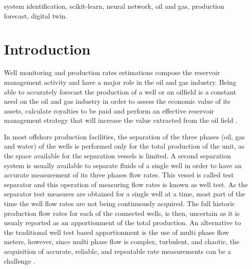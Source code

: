 \documentclass[conference]{IEEEtran}
\begin{document}
\begin{abstract}
\end{abstract}

\begin{IEEEkeywords}
system identification, scikit-learn, neural network, oil and gas, production forecast, digital twin.
\end{IEEEkeywords}

\section{Introduction}\label{section_introduction}

Well monitoring and production rates estimations compose the reservoir management activity 
and have a major role in the oil and gas industry. Being able to accurately forecast the 
production of a well or an oilfield is a constant need on the oil and gas industry in order 
to assess the economic value of its assets, calculate royalties to be paid and perform an 
effective reservoir management strategy that will increase the value extracted from the oil 
field \cite{alakeely2022simulating}.

In most offshore production facilities, the separation of the three phases (oil, gas and water)
of the wells is performed only for the total production of the unit, as the space available 
for the separation vessels is limited. A second separation system is usually available to 
separate fluids of a single well in order to have an accurate measurement of its three phases 
flow rates. This vessel is called test separator and this operation of measuring flow rates is 
known as well test. As the separator test measures are obtained for a single well at a time, 
most part of the time the well flow rates are not being continuously acquired. The full 
historic production flow rates for each of the connected wells, is then, uncertain as it 
is usualy reported as an apportionment of the total production. An alternative to the 
traditional well test based apportionment is the use of multi phase flow meters, however, 
since multi phase flow is complex, turbulent, and chaotic, the acquisition of accurate, 
reliable, and repeatable rate measurements can be a challenge \cite{Okotie2016}.
\end{document}
